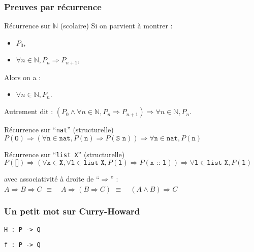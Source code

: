 \documentclass[9pt]{beamer}
\newenvironment{ex}[1][Exemple]{\begin{exampleblock}{#1}}{\end{exampleblock}}
\newenvironment{code}[1][Code]{\begin{block}{#1}}{\end{block}}
\newcommand{\N}{\mathbb{N}}
\begin{document}
\begin{frame}
\frametitle{Preuves par récurrence}

\begin{ex}[Récurrence sur $\N$ (scolaire)]
Si on parvient à montrer :
\begin{itemize}
 \item $P_0$,
 \item $\forall n \in \N, P_n \Rightarrow P_{n+1}$,
\end{itemize}
Alors on a :
\begin{itemize}
 \item $\forall n \in \N, P_n$.
\end{itemize}
Autrement dit : 
$(P_0 \wedge \forall n \in \N, P_n \Rightarrow P_{n+1}) \Rightarrow \forall n \in \N, P_n$.
\end{ex}

\begin{code}[Récurrence sur “\texttt{nat}” (structurelle)]
$P(\texttt{O}) \Rightarrow
  (\forall \texttt{n} \in \texttt{nat}, P(\texttt{n}) \Rightarrow P(\texttt{S n})) \Rightarrow
  \forall \texttt{n} \in \texttt{nat}, P(\texttt{n})$
\end{code}

\begin{code}[Récurrence sur “\texttt{list X}” (structurelle)]
$P(\texttt{[]}) \Rightarrow
  (\forall \texttt{x} \in \texttt{X}, \forall \texttt{l} \in \texttt{list X}, P(\texttt{l}) \Rightarrow P(\texttt{x :: l})) \Rightarrow
  \forall \texttt{l} \in \texttt{list X}, P(\texttt{l})$
\end{code}

avec associativité à droite de “$\Rightarrow$” :
\\\quad$A \Rightarrow B \Rightarrow C$
\quad$\equiv\quad A \Rightarrow (B \Rightarrow C)$
\quad$\equiv\quad (A \wedge B) \Rightarrow C$
\end{frame}



\begin{frame}
\frametitle{Un petit mot sur Curry-Howard}

\huge

\begin{center}
\texttt{H : P -> Q}

\texttt{f : P -> Q}
\end{center}

\end{frame}
\end{document}
